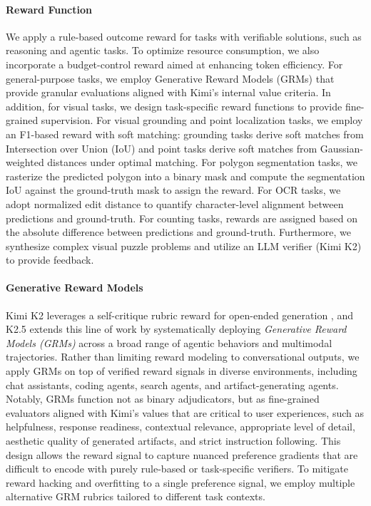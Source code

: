 \paragraph{Reward Function} 
We apply a rule-based outcome reward for tasks with verifiable solutions, such as reasoning and agentic tasks. 
To optimize resource consumption, we also incorporate a budget-control reward aimed at enhancing token efficiency. %
For general-purpose tasks, we employ Generative Reward Models (GRMs) that provide granular evaluations aligned with Kimi's internal value criteria. 
In addition, for visual tasks, we design task-specific reward functions to provide fine-grained supervision. 
For visual grounding and point localization tasks, we employ an F1-based reward with soft matching: grounding tasks derive soft matches from Intersection over Union (IoU) and point tasks derive soft matches from Gaussian-weighted distances under optimal matching. 
For polygon segmentation tasks, we rasterize the predicted polygon into a binary mask and compute the segmentation IoU against the ground-truth mask to assign the reward. 
For OCR tasks, we adopt normalized edit distance to quantify character-level alignment between predictions and ground-truth. 
For counting tasks, rewards are assigned based on the absolute difference between predictions and ground-truth. 
Furthermore, we synthesize complex visual puzzle problems and utilize an LLM verifier (Kimi K2) to provide feedback.


\paragraph{Generative Reward Models}
Kimi K2 leverages a self-critique rubric reward for open-ended generation \cite{team2025kimik2}, and K2.5 extends this line of work by systematically deploying \emph{Generative Reward Models (GRMs)} across a broad range of agentic behaviors and multimodal trajectories. Rather than limiting reward modeling to conversational outputs, we apply GRMs on top of verified reward signals in diverse environments, including chat assistants, coding agents, search agents, and artifact-generating agents. Notably, GRMs function not as binary adjudicators, but as fine-grained evaluators aligned with Kimi's values that are critical to user experiences, such as helpfulness, response readiness, contextual relevance, appropriate level of detail, aesthetic quality of generated artifacts, and strict instruction following. This design allows the reward signal to capture nuanced preference gradients that are difficult to encode with purely rule-based or task-specific verifiers.
To mitigate reward hacking and overfitting to a single preference signal, we employ multiple alternative GRM rubrics tailored to different task contexts.


